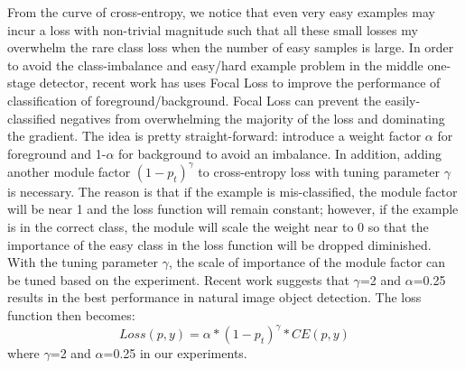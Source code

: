 \documentclass[conference]{IEEEtran}
\begin{document}
    From the curve of cross-entropy, we notice that even very easy examples may incur a loss with non-trivial magnitude such that all these small losses my overwhelm the rare class loss when the number of easy samples is large. In order to avoid the class-imbalance and easy/hard example problem in the middle one-stage detector, recent work has uses Focal Loss to improve the performance of classification of foreground/background. Focal Loss can prevent the easily-classified negatives from overwhelming the majority of the loss and dominating the gradient. The idea is pretty straight-forward: introduce a weight factor \(\alpha\) for foreground and 1-\(\alpha\) for background to avoid an imbalance. In addition, adding another module factor \(\left ( 1-p_{t} \right )^{\gamma }\) to cross-entropy loss with tuning parameter \(\gamma\) is necessary. The reason is that if the example is mis-classified, the module factor will be near 1 and the loss function will remain constant; however, if the example is in the correct class, the module will scale the weight near to 0 so that the importance of the easy class in the loss function will be dropped diminished. With the tuning parameter \(\gamma\), the scale of importance of the module factor can be tuned based on the experiment. Recent work suggests that \(\gamma\)=2 and \(\alpha\)=0.25 results in the best performance in natural image object detection. The loss function then becomes:
	\begin{equation}
		Loss(p,y)=\alpha*\left ( 1-p_{t} \right )^{\gamma }*CE(p,y)
    \end{equation}	
    where \(\gamma\)=2 and \(\alpha\)=0.25 in our experiments.
    
\end{document}
